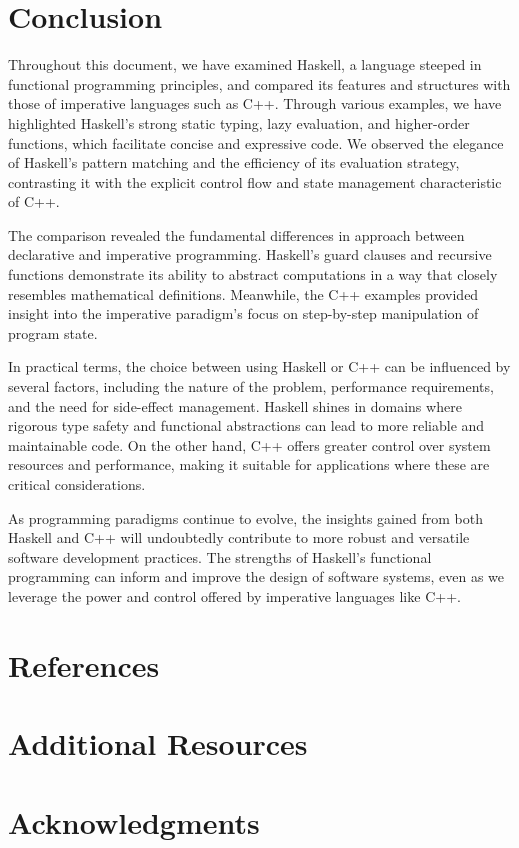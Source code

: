 \documentclass[a4paper, 10pt]{article}
\begin{document}
    \newpage
    \section{Conclusion}
    \noindent Throughout this document, we have examined Haskell, a language steeped in functional programming principles, and compared its features and structures with those of imperative languages such as C++. Through various examples, we have highlighted Haskell's strong static typing, lazy evaluation, and higher-order functions, which facilitate concise and expressive code. We observed the elegance of Haskell's pattern matching and the efficiency of its evaluation strategy, contrasting it with the explicit control flow and state management characteristic of C++.

    \noindent The comparison revealed the fundamental differences in approach between declarative and imperative programming. Haskell's guard clauses and recursive functions demonstrate its ability to abstract computations in a way that closely resembles mathematical definitions. Meanwhile, the C++ examples provided insight into the imperative paradigm's focus on step-by-step manipulation of program state.

    \noindent In practical terms, the choice between using Haskell or C++ can be influenced by several factors, including the nature of the problem, performance requirements, and the need for side-effect management. Haskell shines in domains where rigorous type safety and functional abstractions can lead to more reliable and maintainable code. On the other hand, C++ offers greater control over system resources and performance, making it suitable for applications where these are critical considerations.

    \noindent As programming paradigms continue to evolve, the insights gained from both Haskell and C++ will undoubtedly contribute to more robust and versatile software development practices. The strengths of Haskell's functional programming can inform and improve the design of software systems, even as we leverage the power and control offered by imperative languages like C++.
	\section{References}
	\section{Additional Resources}
	\section{Acknowledgments}
\end{document}
